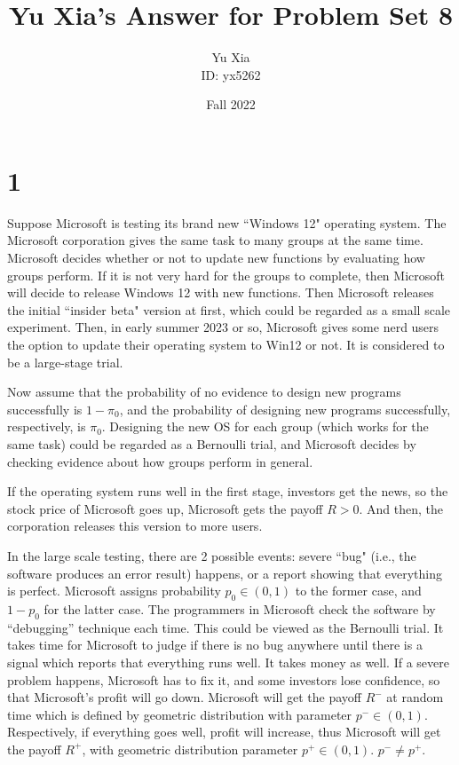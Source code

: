 \documentclass{article}
\author{Yu Xia \\ ID: yx5262}
\title{Yu Xia's Answer for Problem Set 8}
\date{Fall 2022}
\begin{document}
\maketitle

\nocite{*}

\section*{1}

Suppose Microsoft is testing its brand new ``Windows 12" operating system. The Microsoft corporation gives the same task to many groups at the same time. Microsoft decides whether or not to update new functions by evaluating how groups perform. If it is not very hard for the groups to complete, then Microsoft will decide to release Windows 12 with new functions. Then Microsoft releases the initial ``insider beta" version at first, which could be regarded as a small scale experiment. Then, in early summer 2023 or so, Microsoft gives some nerd users the option to update their operating system to Win12 or not. It is considered to be a large-stage trial. 

Now assume that the probability of no evidence to design new programs successfully is $1-\pi_{0}$, and the probability of designing new programs successfully, respectively, is $\pi_{0}$. Designing the new OS for each group (which works for the same task) could be regarded as a Bernoulli trial, and Microsoft decides by checking evidence about how groups perform in general.

If the operating system runs well in the first stage, investors get the news, so the stock price of Microsoft goes up, Microsoft gets the payoff $R>0$. And then, the corporation releases this version to more users. 

In the large scale testing, there are 2 possible events: severe ``bug" (i.e., the software produces an error result) happens, or a report showing that everything is perfect. Microsoft assigns probability $p_{0}\in\left(0,1\right)$ to the former case, and $1-p_{0}$ for the latter case. The programmers in Microsoft check the software by ``debugging'' technique each time. This could be viewed as the Bernoulli trial. It takes time for Microsoft to judge if there is no bug anywhere until there is a signal which reports that everything runs well. It takes money as well. If a severe problem happens, Microsoft has to fix it, and some investors lose confidence, so that Microsoft's profit will go down. Microsoft will get the payoff $R^{-}$ at random time which is defined by geometric distribution with parameter $p^{-}\in\left(0,1\right)$. Respectively, if everything goes well, profit will increase, thus Microsoft will get the payoff $R^{+}$, with geometric distribution parameter $p^{+}\in\left(0,1\right)$. $p^{-}\neq p^{+}$.
\end{document}
